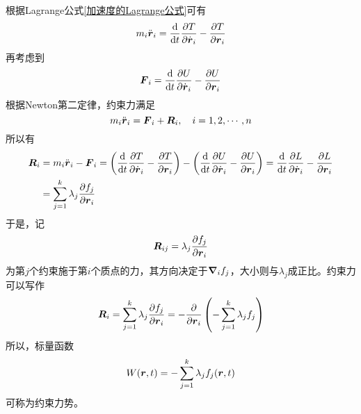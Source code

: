 根据Lagrange公式\eqref{加速度的Lagrange公式}可有
\begin{equation*}
	m_i \ddot{\boldsymbol{r}}_i = \frac{\mathrm{d}}{\mathrm{d} t} \frac{\partial T}{\partial \dot{\boldsymbol{r}}_i} - \frac{\partial T}{\partial \boldsymbol{r}_i}
\end{equation*}
再考虑到
\begin{equation*}
	\boldsymbol{F}_i = \frac{\mathrm{d}}{\mathrm{d} t} \frac{\partial U}{\partial \dot{\boldsymbol{r}}_i} - \frac{\partial U}{\partial \boldsymbol{r}_i}
\end{equation*}
根据Newton第二定律，约束力满足
\begin{equation*}
	m_i \ddot{\boldsymbol{r}}_i = \boldsymbol{F}_i + \boldsymbol{R}_i,\quad i=1,2,\cdots,n
\end{equation*}
所以有
\begin{align}
	\boldsymbol{R}_i & = m_i\ddot{\boldsymbol{r}}_i - \boldsymbol{F}_i = \left(\frac{\mathrm{d}}{\mathrm{d} t} \frac{\partial T}{\partial \dot{\boldsymbol{r}}_i} - \frac{\partial T}{\partial \boldsymbol{r}_i}\right) - \left(\frac{\mathrm{d}}{\mathrm{d} t} \frac{\partial U}{\partial \dot{\boldsymbol{r}}_i} - \frac{\partial U}{\partial \boldsymbol{r}_i}\right) \nonumber = \frac{\mathrm{d}}{\mathrm{d} t} \frac{\partial L}{\partial \dot{\boldsymbol{r}}_i} - \frac{\partial L}{\partial \boldsymbol{r}_i} \nonumber \\
	& = \sum_{j=1}^k \lambda_j \frac{\partial f_j}{\partial \boldsymbol{r}_i}
\end{align}
于是，记
\begin{equation}
	\boldsymbol{R}_{ij} = \lambda_j \frac{\partial f_j}{\partial \boldsymbol{r}_i}
\end{equation}
为第$j$个约束施于第$i$个质点的力，其方向决定于$\boldsymbol{\nabla}_i f_j$，大小则与$\lambda_j$成正比。约束力可以写作
\begin{equation*}
	\boldsymbol{R}_i = \sum_{j=1}^k \lambda_j \frac{\partial f_j}{\partial \boldsymbol{r}_i} = -\frac{\partial}{\partial \boldsymbol{r}_i} \left(-\sum_{j=1}^k \lambda_j f_j\right)
\end{equation*}
所以，标量函数
\begin{equation}
	W(\boldsymbol{r},t) = -\sum_{j=1}^k \lambda_j f_j(\boldsymbol{r},t)
\end{equation}
可称为{\heiti 约束力势}。

